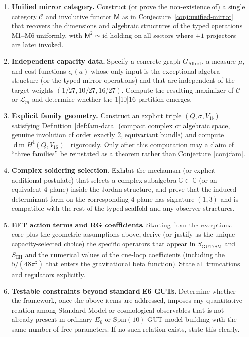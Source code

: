 \documentclass[11pt]{article}
\theoremstyle{plain}
\theoremstyle{definition}
\theoremstyle{remark}
\numberwithin{equation}{section}
\newcommand{\C}{\mathbb{C}}
\newcommand{\Oct}{\mathbb{O}}
\newcommand{\Spin}{\mathrm{Spin}}
\newcommand{\Mirror}{\mathsf{M}}
\newcommand{\capacity}{\mathcal{C}}
\begin{document}
\begin{enumerate}[leftmargin=*]
\item \textbf{Unified mirror category.} Construct (or prove the non-existence of) a single category $\mathcal{C}$ and involutive functor $\Mirror$ as in Conjecture~\ref{conj:unified-mirror} that recovers the dimensions and algebraic structures of the typed operations M1--M6 uniformly, with $\Mirror^2\simeq\mathrm{id}$ holding on all sectors where $\pm 1$ projectors are later invoked.

\item \textbf{Independent capacity data.} Specify a concrete graph $G_{\mathrm{Albert}}$, a measure $\mu$, and cost functions $c_i(a)$ whose only input is the exceptional algebra structure (or the typed mirror operations) and that are independent of the target weights $(1/27,10/27,16/27)$. Compute the resulting maximizer of $\capacity$ or $\mathcal{L}_m$ and determine whether the 1|10|16 partition emerges.

\item \textbf{Explicit family geometry.} Construct an explicit triple $(Q,\sigma,V_{16})$ satisfying Definition~\ref{def:fam-data} (compact complex or algebraic space, genuine involution of order exactly 2, equivariant bundle) and compute $\dim H^1(Q,V_{16})^{-}$ rigorously. Only after this computation may a claim of ``three families'' be reinstated as a theorem rather than Conjecture~\ref{conj:fam}.

\item \textbf{Complex soldering selection.} Exhibit the mechanism (or explicit additional postulate) that selects a complex subalgebra $\C\subset\Oct$ (or an equivalent 4-plane) inside the Jordan structure, and prove that the induced determinant form on the corresponding 4-plane has signature $(1,3)$ and is compatible with the rest of the typed scaffold and any observer structures.

\item \textbf{EFT action terms and RG coefficients.} Starting from the exceptional core plus the geometric assumptions above, derive (or justify as the unique capacity-selected choice) the specific operators that appear in $S_{\mathrm{GUT/SM}}$ and $S_{\mathrm{EH}}$ and the numerical values of the one-loop coefficients (including the $5/(48\pi^2)$ that enters the gravitational beta function). State all truncations and regulators explicitly.

\item \textbf{Testable constraints beyond standard E6 GUTs.} Determine whether the framework, once the above items are addressed, imposes any quantitative relation among Standard-Model or cosmological observables that is not already present in ordinary $E_6$ or $\Spin(10)$ GUT model building with the same number of free parameters. If no such relation exists, state this clearly.
\end{enumerate}
\end{document}
